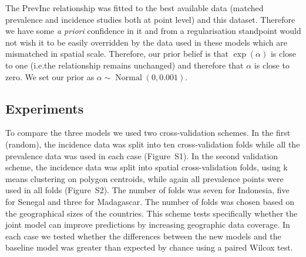 \documentclass{statsoc}
\begin{document}
The PrevInc relationship was fitted to the best available data (matched prevalence and incidence studies both at point level) and this dataset.
Therefore we have some \emph{a priori} confidence in it and from a regularisation standpoint would not wish it to be easily overridden by the data used in these models which are mismatched in spatial scale.
Therefore, our prior belief is that $\exp(\alpha)$ is close to one (i.e.\thinspace the relationship remains unchanged) and therefore that $\alpha$ is close to zero.
We set our prior as $\alpha \sim \operatorname{Normal}(0, 0.001)$.


\subsection*{Experiments}

To compare the three models we used two cross-validation schemes. 
In the first (random), the incidence data was split into ten cross-validation folds while all the prevalence data was used in each case (Figure~S1). 
In the second validation scheme, the incidence data was split into spatial cross-validation folds, using k means clustering on polygon centroids, while again all prevalence points were used in all folds (Figure~S2).
The number of folds was seven for Indonesia, five for Senegal and three for Madagascar.
The number of folds was chosen based on the geographical sizes of the countries.
This scheme tests specifically whether the joint model can improve predictions by increasing geographic data coverage.
In each case we tested whether the differences between the new models and the baseline model was greater than expected  by chance using a paired Wilcox test.



\begin{table}
\caption{\label{table1}Summary of out-of-sample accuracy for all cross-validation experiments. 
Mean absolute error of predicted incidence rate against out-of-sample observed data for three countries. 
Results that are significantly better or worse than the baseline (at the 95\% significance level) are indicated with a dagger or asterisk respectively.
}
\centering
{}
\end{table}
\end{document}
